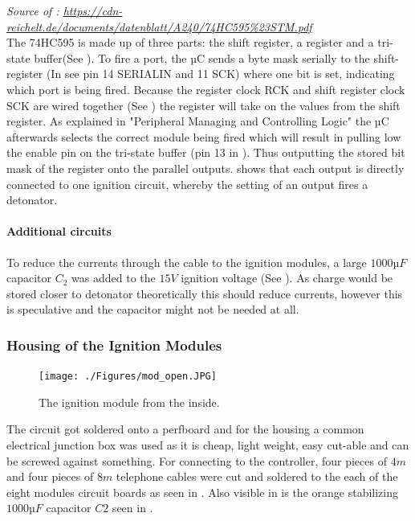 \noindent \textit{\small{Source of : \url{https://cdn-reichelt.de/documents/datenblatt/A240/74HC595\%23STM.pdf}}}\\

\noindent The 74HC595 is made up of three parts: the shift register, a register and a tri-state buffer(See ). To fire a port, the µC sends a byte mask serially to the shift-register (In  see pin 14 SERIALIN and 11 SCK) where one bit is set, indicating which port is being fired. Because the register clock RCK and shift register clock SCK are wired together (See ) the register will take on the values from the shift register. As explained in  "Peripheral Managing and Controlling Logic" the µC afterwards selects the correct module being fired which will result in pulling low the enable pin on the tri-state buffer (pin 13 in ). Thus outputting the stored bit mask of the register onto the parallel outputs.  shows that each output is directly connected to one ignition circuit, whereby the setting of an output fires a detonator.\\

\paragraph{Additional circuits}
To reduce the currents through the cable to the ignition modules, a large $1000µF$ capacitor $C_2$ was added to the $15V$ ignition voltage (See ). As charge would be stored closer to detonator theoretically this should reduce currents, however this is speculative and the capacitor might not be needed at all.\\


\pagebreak

\subsubsection{Housing of the Ignition Modules}

\begin{figure}[!ht]
    \centering
    \texttt{[image: ./Figures/mod\_open.JPG]}
    \caption{The ignition module from the inside.}
    \label{fig:mod_open}     
\end{figure}

\noindent The circuit got soldered onto a perfboard and for the housing a common electrical junction box was used as it is cheap, light weight, easy cut-able and can be screwed against something. For connecting to the controller, four pieces of $4m$ and four pieces of $8m$ telephone cables were cut and soldered to the each of the eight modules circuit boards as seen in . Also visible in  is the orange stabilizing $1000µF$ capacitor $C2$ seen in .

